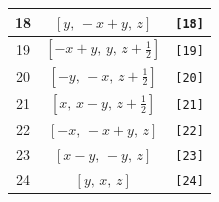 \documentclass[fleqn,8pt]{jsarticle}
\begin{document}
\begin{longtable}{ccc}
18 & $\left[ y,\, - x + y,\, z \right]$ & {\tt [18]} \\ \hline
19 & $\left[ - x + y,\, y,\, z + \frac{1}{2} \right]$ & {\tt [19]} \\ \hline
20 & $\left[ - y,\, - x,\, z + \frac{1}{2} \right]$ & {\tt [20]} \\ \hline
21 & $\left[ x,\, x - y,\, z + \frac{1}{2} \right]$ & {\tt [21]} \\ \hline
22 & $\left[ - x,\, - x + y,\, z \right]$ & {\tt [22]} \\ \hline
23 & $\left[ x - y,\, - y,\, z \right]$ & {\tt [23]} \\ \hline
24 & $\left[ y,\, x,\, z \right]$ & {\tt [24]} \\
\end{longtable}
\end{document}
